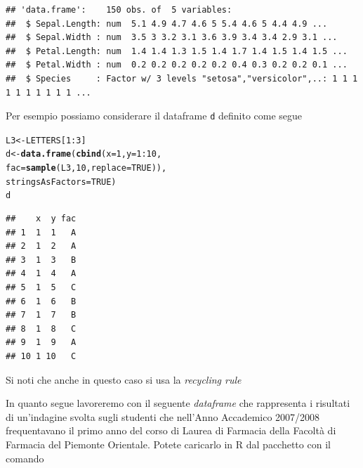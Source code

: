\documentclass[onecolumn,12pt]{book}\usepackage[]{graphicx}\usepackage[]{color}
\makeatletter
\newcommand{\hlnum}[1]{\textcolor[rgb]{0.686,0.059,0.569}{#1}}%
\newcommand{\hlopt}[1]{\textcolor[rgb]{0,0,0}{#1}}%
\newcommand{\hlstd}[1]{\textcolor[rgb]{0.345,0.345,0.345}{#1}}%
\newcommand{\hlkwb}[1]{\textcolor[rgb]{0.69,0.353,0.396}{#1}}%
\newcommand{\hlkwc}[1]{\textcolor[rgb]{0.333,0.667,0.333}{#1}}%
\newcommand{\hlkwd}[1]{\textcolor[rgb]{0.737,0.353,0.396}{\textbf{#1}}}%
\newenvironment{kframe}{%
 \def\at@end@of@kframe{}%
 \ifinner\ifhmode%
  \def\at@end@of@kframe{\end{minipage}}%
  \begin{minipage}{\columnwidth}%
 \fi\fi%
 \def\FrameCommand##1{\hskip\@totalleftmargin \hskip-\fboxsep
 \colorbox{shadecolor}{##1}\hskip-\fboxsep
     \hskip-\linewidth \hskip-\@totalleftmargin \hskip\columnwidth}%
 \MakeFramed {\advance\hsize-\width
   \@totalleftmargin\z@ \linewidth\hsize
   \@setminipage}}%
 {\par\unskip\endMakeFramed%
 \at@end@of@kframe}
\newenvironment{knitrout}{}{} %
\makeatother
\begin{document}
\small
\begin{knitrout}
\color{fgcolor}\begin{kframe}
\begin{verbatim}
## 'data.frame':	150 obs. of  5 variables:
##  $ Sepal.Length: num  5.1 4.9 4.7 4.6 5 5.4 4.6 5 4.4 4.9 ...
##  $ Sepal.Width : num  3.5 3 3.2 3.1 3.6 3.9 3.4 3.4 2.9 3.1 ...
##  $ Petal.Length: num  1.4 1.4 1.3 1.5 1.4 1.7 1.4 1.5 1.4 1.5 ...
##  $ Petal.Width : num  0.2 0.2 0.2 0.2 0.2 0.4 0.3 0.2 0.2 0.1 ...
##  $ Species     : Factor w/ 3 levels "setosa","versicolor",..: 1 1 1 1 1 1 1 1 1 1 ...
\end{verbatim}
\end{kframe}
\end{knitrout}
\normalsize
Per esempio possiamo considerare il dataframe \texttt{d} definito come segue 
\begin{knitrout}
\color{fgcolor}\begin{kframe}
\begin{alltt}
\hlstd{L3} \hlkwb{<-} \hlstd{LETTERS[}\hlnum{1}\hlopt{:}\hlnum{3}\hlstd{]}
\hlstd{d} \hlkwb{<-} \hlkwd{data.frame}\hlstd{(}\hlkwd{cbind}\hlstd{(}\hlkwc{x}\hlstd{=}\hlnum{1}\hlstd{,} \hlkwc{y}\hlstd{=}\hlnum{1}\hlopt{:}\hlnum{10}\hlstd{,}
\hlkwc{fac}\hlstd{=}\hlkwd{sample}\hlstd{(L3,} \hlnum{10}\hlstd{,} \hlkwc{replace}\hlstd{=}\hlnum{TRUE}\hlstd{)),}
\hlkwc{stringsAsFactors}\hlstd{=}\hlnum{TRUE}\hlstd{)}
\hlstd{d}
\end{alltt}
\begin{verbatim}
##    x  y fac
## 1  1  1   A
## 2  1  2   A
## 3  1  3   B
## 4  1  4   A
## 5  1  5   C
## 6  1  6   B
## 7  1  7   B
## 8  1  8   C
## 9  1  9   A
## 10 1 10   C
\end{verbatim}
\end{kframe}
\end{knitrout}
Si noti che anche in questo caso si usa la \emph{recycling rule}

In quanto segue lavoreremo con il seguente \emph{dataframe} che rappresenta i risultati di un'indagine svolta sugli studenti che nell'Anno Accademico 2007/2008 frequentavano il primo anno del corso di Laurea di Farmacia della Facolt\`a di Farmacia del Piemonte Orientale. Potete caricarlo  in {\textsf R} dal pacchetto con il comando
\end{document}

